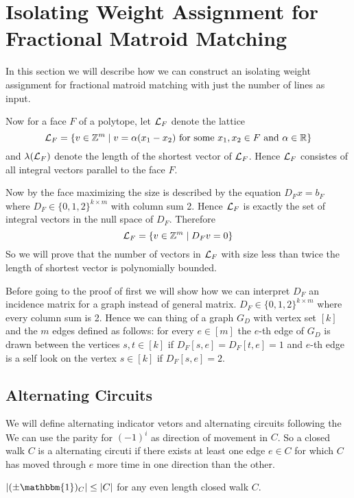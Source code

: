 \section{Isolating Weight Assignment for Fractional Matroid Matching}
In this section we will describe how we can construct an isolating weight assignment for fractional matroid matching with just the number of lines as input.

Now for a face $F$ of a polytope, let $\mathcal{L}_F$ denote the lattice $$\mathcal{L}_F=\{v\in\mathbb{Z}^{m}\mid v=\alpha(x_1-x_2)\text{  for some $x_1,x_2\in F$ and $\alpha\in\mathbb{R}$}\}$$and $\lambda(\mathcal{L}_F)$ denote the length of the shortest vector of $\mathcal{L}_F$. Hence $\mathcal{L}_F$ consistes of all integral vectors parallel to the face $F$.

Now by  the face maximizing the size is described by the equation $D_Fx=b_F$ where $D_F\in \{0,1,2\}^{k\times m}$ with column sum 2. Hence $\mathcal{L}_F$ is exactly the set of integral vectors in the null space of $D_F$. Therefore $$\mathcal{L}_F=\{v\in\mathbb{Z}^{m}\mid D_Fv=0\}$$So we will prove that the number of vectors in $\mathcal{L}_F$ with size less than twice the length of shortest vector is polynomially bounded.

Before going to the proof of  first we will show how we can interpret $D_F$ an incidence matrix for a graph instead of general matrix. $D_F\in \{0,1,2\}^{k\times m}$ where every column sum is 2. Hence we can thing of a graph $G_D$ with vertex set $[k]$ and the $m$ edges defined as follows: for every $e\in [m]$ the $e$-th edge of $G_D$ is drawn between the vertices $s,t\in[k]$ if $D_F[s,e]=D_F[t,e]=1$ and $e$-th edge is a self look on the vertex $s\in[k]$ if $D_F[s,e]=2$.  
\subsection{Alternating Circuits}
We will define alternating indicator vetors and alternating circuits following the \cite{generalmatchingola}
We can use the parity for $(-1)^{i}$ as direction of movement in $C$. So a closed walk $C$ is a alternating circuti if there exists at least one edge $e\in C$ for which $C$ has moved through $e$ more time in one direction than the other.
\begin{observation*}
	$|(\pm \mathbbm{1})_C|\leq |C|$ for any even length closed walk $C$.
\end{observation*}


